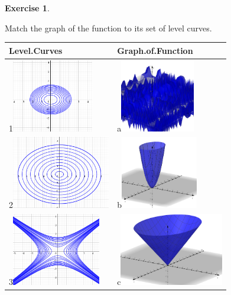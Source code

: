 \documentclass[
]{book}
\theoremstyle{definition}
\theoremstyle{definition}
\theoremstyle{definition}
\newtheorem{exercise}{Exercise}[chapter]
\theoremstyle{definition}
\theoremstyle{remark}
\begin{document}
\begin{exercise}
\protect\hypertarget{exr:unlabeled-div-7}{}\label{exr:unlabeled-div-7}

Match the graph of the function to its set of level curves.

\begin{longtable}[]{@{}ll@{}}
\toprule
Level.Curves & Graph.of.Function \\
\midrule
\endhead
1\includegraphics[width=\textwidth,height=1.25in]{images/paraboloid.png} & a\includegraphics[width=\textwidth,height=1.25in]{images/sin-cos-3d.png} \\
2\includegraphics[width=\textwidth,height=1.25in]{images/cone.png} & b\includegraphics[width=\textwidth,height=1.25in]{images/paraboloid-3d.png} \\
3\includegraphics[width=\textwidth,height=1.25in]{images/hyperbola.png} & c\includegraphics[width=\textwidth,height=1.25in]{images/cone-3d.png} \\

\end{longtable}
\end{exercise}
\end{document}
